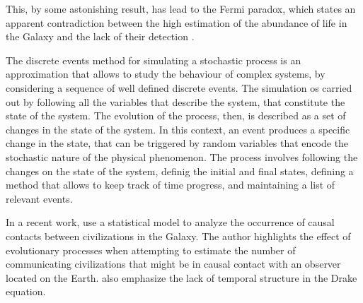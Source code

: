 \documentclass[crop]{CSLB}%
\begin{document}
This, by some astonishing result, has lead to the Fermi paradox, which
states an apparent contradiction between the high estimation of the
abundance of life in the Galaxy and the lack of their detection
\citep{vanhouten_isthere_2017}.









The discrete events method for simulating a stochastic process is an
approximation that allows to study the behaviour of complex
systems, by considering a sequence of well defined discrete events.
%
The simulation os carried out by following all the variables that
describe the system, that constitute the state of the system.
%
The evolution of the process, then, is described as a set of changes
in the state of the system.
%
In this context, an event produces a specific change in the state,
that can be triggered by random variables that encode the stochastic
nature of the physical phenomenon.
%
The process involves following the changes on the state of the system,
definig the initial and final states, defining a method that allows to
keep track of time progress, and maintaining a list of relevant
events.


In a recent work, \citep{balbi_impact_2018} use a statistical model to analyze
the occurrence of causal contacts between civilizations in the Galaxy.
%
The author highlights the effect of evolutionary processes when
attempting to estimate the number of communicating civilizations that
might be in causal contact with an observer located on the Earth.
%
\citet{cirkovic_temporal_2004} also emphasize the lack of temporal
structure in the Drake equation.



\end{document}
